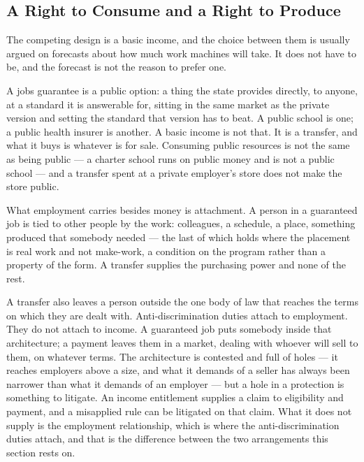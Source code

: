 \subsection{A Right to Consume and a Right to Produce}
\label{sec:right-consume}
The competing design is a basic income, and the choice between them is usually argued on forecasts about how much work machines will take. It does not have to be, and the forecast is not the reason to prefer one.

A jobs guarantee is a public option: a thing the state provides directly, to anyone, at a standard it is answerable for, sitting in the same market as the private version and setting the standard that version has to beat. A public school is one; a public health insurer is another. A basic income is not that. It is a transfer, and what it buys is whatever is for sale. Consuming public resources is not the same as being public — a charter school runs on public money and is not a public school — and a transfer spent at a private employer's store does not make the store public.

What employment carries besides money is attachment. A person in a guaranteed job is tied to other people by the work: colleagues, a schedule, a place, something produced that somebody needed — the last of which holds where the placement is real work and not make-work, a condition on the program rather than a property of the form. A transfer supplies the purchasing power and none of the rest.

A transfer also leaves a person outside the one body of law that reaches the terms on which they are dealt with. Anti-discrimination duties attach to employment. They do not attach to income. A guaranteed job puts somebody inside that architecture; a payment leaves them in a market, dealing with whoever will sell to them, on whatever terms. The architecture is contested and full of holes — it reaches employers above a size, and what it demands of a seller has always been narrower than what it demands of an employer — but a hole in a protection is something to litigate. An income entitlement supplies a claim to eligibility and payment, and a misapplied rule can be litigated on that claim. What it does not supply is the employment relationship, which is where the anti-discrimination duties attach, and that is the difference between the two arrangements this section rests on.


